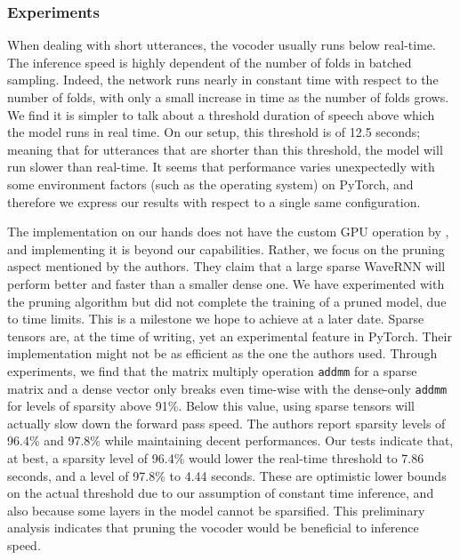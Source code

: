 \documentclass[a4paper, oneside, 12pt, english]{article}
\begin{document}
\subsubsection{Experiments} \label{vocoder_experiments}
When dealing with short utterances, the vocoder usually runs below real-time. The inference speed is highly dependent of the number of folds in batched sampling. Indeed, the network runs nearly in constant time with respect to the number of folds, with only a small increase in time as the number of folds grows. We find it is simpler to talk about a threshold duration of speech above which the model runs in real time. On our setup, this threshold is of 12.5 seconds; meaning that for utterances that are shorter than this threshold, the model will run slower than real-time. It seems that performance varies unexpectedly with some environment factors (such as the operating system) on PyTorch, and therefore we express our results with respect to a single same configuration.

The implementation on our hands does not have the custom GPU operation by \citep{WaveRNN}, and implementing it is beyond our capabilities. Rather, we focus on the pruning aspect mentioned by the authors. They claim that a large sparse WaveRNN will perform better and faster than a smaller dense one. We have experimented with the pruning algorithm but did not complete the training of a pruned model, due to time limits. This is a milestone we hope to achieve at a later date. Sparse tensors are, at the time of writing, yet an experimental feature in PyTorch. Their implementation might not be as efficient as the one the authors used. Through experiments, we find that the matrix multiply operation \texttt{addmm} for a sparse matrix and a dense vector only breaks even  time-wise with the dense-only \texttt{addmm} for levels of sparsity above 91\%. Below this value, using sparse tensors will actually slow down the forward pass speed. The authors report sparsity levels of 96.4\% and 97.8\% \citep[Table 5]{WaveRNN} while maintaining decent performances. Our tests indicate that, at best, a sparsity level of 96.4\% would lower the real-time threshold to 7.86 seconds, and a level of 97.8\% to 4.44 seconds. These are optimistic lower bounds on the actual threshold due to our assumption of constant time inference, and also because some layers in the model cannot be sparsified. This preliminary analysis indicates that pruning the vocoder would be beneficial to inference speed.
\end{document}
